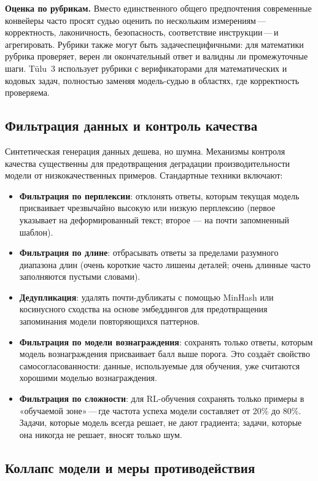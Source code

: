 \textbf{Оценка по рубрикам.} Вместо единственного общего предпочтения современные конвейеры часто просят судью оценить по нескольким измерениям\,---\,корректность, лаконичность, безопасность, соответствие инструкции\,---\,и агрегировать. Рубрики также могут быть задачеспецифичными: для математики рубрика проверяет, верен ли окончательный ответ и валидны ли промежуточные шаги. T\"{u}lu~3 использует рубрики с верификаторами для математических и кодовых задач, полностью заменяя модель-судью в областях, где корректность проверяема.

\subsection{Фильтрация данных и контроль качества}

Синтетическая генерация данных дешева, но шумна. Механизмы контроля качества существенны для предотвращения деградации производительности модели от низкокачественных примеров. Стандартные техники включают:

\begin{itemize}[leftmargin=*]
  \item \textbf{Фильтрация по перплексии}: отклонять ответы, которым текущая модель присваивает чрезвычайно высокую или низкую перплексию (первое указывает на деформированный текст; второе --- на почти запомненный шаблон).
  \item \textbf{Фильтрация по длине}: отбрасывать ответы за пределами разумного диапазона длин (очень короткие часто лишены деталей; очень длинные часто заполняются пустыми словами).
  \item \textbf{Дедупликация}: удалять почти-дубликаты с помощью MinHash или косинусного сходства на основе эмбеддингов для предотвращения запоминания модели повторяющихся паттернов.
  \item \textbf{Фильтрация по модели вознаграждения}: сохранять только ответы, которым модель вознаграждения присваивает балл выше порога. Это создаёт свойство самосогласованности: данные, используемые для обучения, уже считаются хорошими моделью вознаграждения.
  \item \textbf{Фильтрация по сложности}: для RL-обучения сохранять только примеры в «обучаемой зоне»\,---\,где частота успеха модели составляет от 20\% до 80\%. Задачи, которые модель всегда решает, не дают градиента; задачи, которые она никогда не решает, вносят только шум.
\end{itemize}

\subsection{Коллапс модели и меры противодействия}

